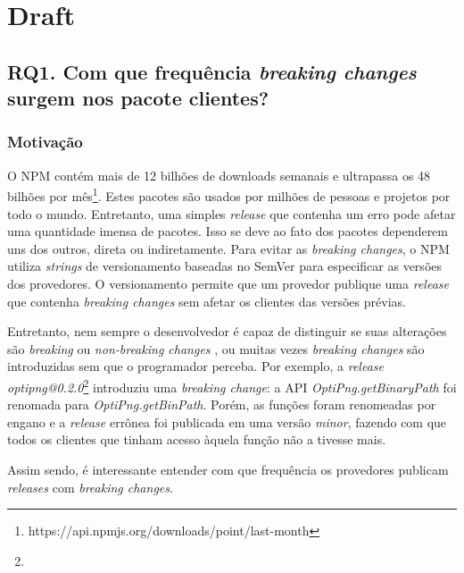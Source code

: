 \chapter{Draft}

\section{RQ1. Com que frequência \textit{breaking changes} surgem nos pacote clientes?}
\label{sec:rq1}

\subsection{Motivação}
\label{mot:rq1}

O \Gls{NPM} contém mais de 12 bilhões de downloads semanais e ultrapassa os 48 bilhões por mês\footnote{https://api.npmjs.org/downloads/point/last-month}. Estes pacotes são usados por milhões de pessoas e projetos por todo o mundo. Entretanto, uma simples \textit{release} que contenha um erro pode afetar uma quantidade imensa de pacotes. Isso se deve ao fato dos pacotes dependerem uns dos outros, direta ou indiretamente. Para evitar as \textit{breaking changes}, o \Gls{NPM} utiliza \textit{strings} de versionamento baseadas no \Gls{SemVer} para especificar as versões dos provedores. O versionamento permite que um provedor publique uma \textit{release} que contenha \textit{breaking changes} sem afetar os clientes das versões prévias.

Entretanto, nem sempre o desenvolvedor é capaz de distinguir se suas alterações são \textit{breaking} ou \textit{non-breaking changes} \cite{noregrets2018}, ou muitas vezes \textit{breaking changes} são introduzidas sem que o programador perceba. Por exemplo, a \textit{release optipng@0.2.0}\footnote{} introduziu uma \textit{breaking change}: a \gls{API} \textit{OptiPng.getBinaryPath} foi renomada para \textit{OptiPng.getBinPath}. Porém, as funções foram renomeadas por engano e a \textit{release} errônea foi publicada em uma versão \textit{minor}, fazendo com que todos os clientes que tinham acesso àquela função não a tivesse mais.




Assim sendo, é interessante entender com que frequência os provedores publicam \textit{releases} com \textit{breaking changes}.

